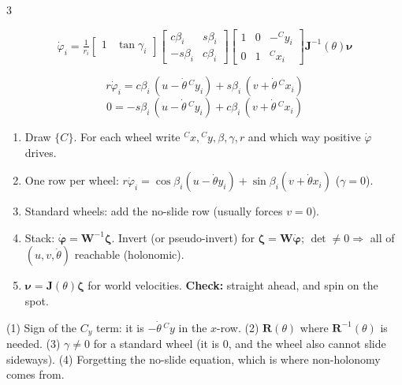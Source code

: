 \begin{multicols}{3}
\begin{fbx}
\[\dot\varphi_i=\tfrac1{r_i}\begin{bmatrix}1&\tan\gamma_i\end{bmatrix}\!\begin{bmatrix}c\beta_i&s\beta_i\\-s\beta_i&c\beta_i\end{bmatrix}\!\begin{bmatrix}1&0&-{}^Cy_i\\0&1&{}^Cx_i\end{bmatrix}\!\mathbf J^{-1}(\theta)\boldsymbol\nu\]
\end{fbx}
\begin{fbx}[Standard wheel ($\gamma=0$): rolling row \textbf{and} no-slide row \pg{37--42,68}]
\[r\dot\varphi_i=c\beta_i\,(u-\dot\theta\,{}^Cy_i)+s\beta_i\,(v+\dot\theta\,{}^Cx_i)\]
\[0=-s\beta_i\,(u-\dot\theta\,{}^Cy_i)+c\beta_i\,(v+\dot\theta\,{}^Cx_i)\]
\end{fbx}
\begin{recipe}
\begin{enumerate}
\item Draw $\{C\}$. For each wheel write ${}^Cx,{}^Cy,\beta,\gamma,r$ and which way positive $\dot\varphi$ drives.
\item One row per wheel: $r\dot\varphi_i=\cos\beta_i(u-\dot\theta y_i)+\sin\beta_i(v+\dot\theta x_i)$ ($\gamma=0$).
\item Standard wheels: add the no-slide row (usually forces $v=0$).
\item Stack: $\dot{\boldsymbol\varphi}=\mathbf W^{-1}\boldsymbol\zeta$. Invert (or pseudo-invert) for $\boldsymbol\zeta=\mathbf W\dot{\boldsymbol\varphi}$; $\det\ne0\Rightarrow$ all of $(u,v,\dot\theta)$ reachable (holonomic).
\item $\boldsymbol\nu=\mathbf J(\theta)\boldsymbol\zeta$ for world velocities. \textbf{Check:} straight ahead, and spin on the spot.
\end{enumerate}
\end{recipe}
\begin{trap}
(1) Sign of the $C_y$ term: it is $-\dot\theta\,{}^Cy$ in the $x$-row. (2) $\mathbf R(\theta)$ where $\mathbf R^{-1}(\theta)$ is needed. (3) $\gamma\neq0$ for a standard wheel (it is 0, and the wheel also cannot slide sideways). (4) Forgetting the no-slide equation, which is where non-holonomy comes from.
\end{trap}


\end{multicols}
